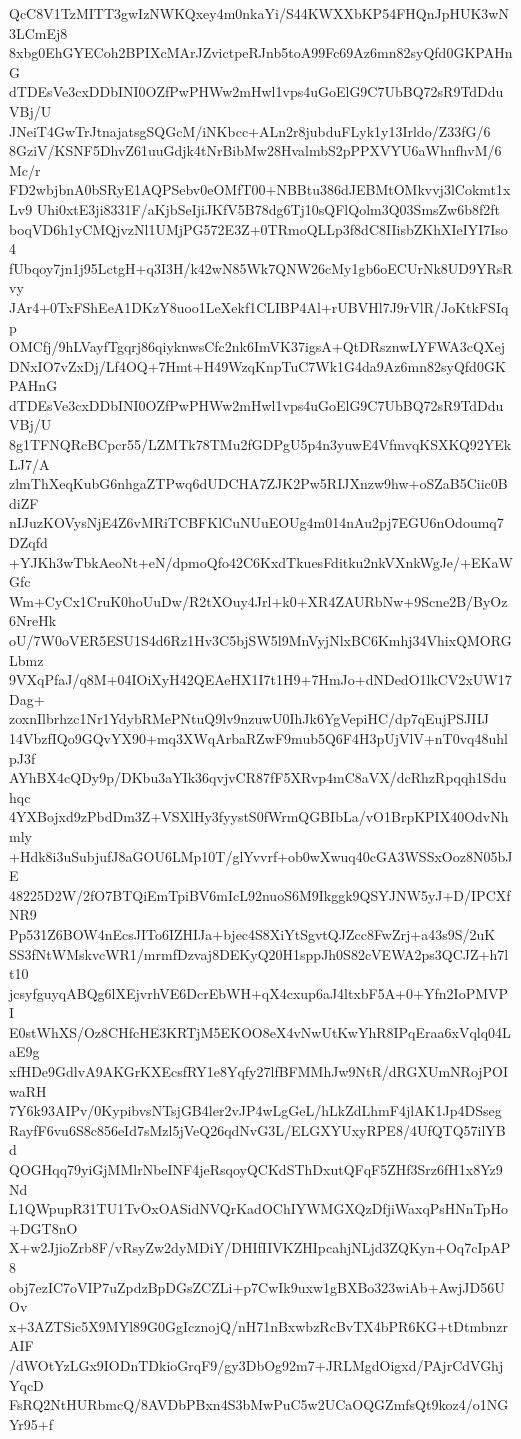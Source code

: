 QcC8V1TzMITT3gwIzNWKQxey4m0nkaYi/S44KWXXbKP54FHQnJpHUK3wN3LCmEj8
8xbg0EhGYECoh2BPIXcMArJZvictpeRJnb5toA99Fc69Az6mn82syQfd0GKPAHnG
dTDEsVe3cxDDbINI0OZfPwPHWw2mHwl1vps4uGoElG9C7UbBQ72sR9TdDduVBj/U
JNeiT4GwTrJtnajatsgSQGcM/iNKbcc+ALn2r8jubduFLyk1y13Irldo/Z33fG/6
8GziV/KSNF5DhvZ61uuGdjk4tNrBibMw28HvalmbS2pPPXVYU6aWhnfhvM/6Mc/r
FD2wbjbnA0bSRyE1AQPSebv0eOMfT00+NBBtu386dJEBMtOMkvvj3lCokmt1xLv9
Uhi0xtE3ji8331F/aKjbSeIjiJKfV5B78dg6Tj10sQFlQolm3Q03SmsZw6b8f2ft
boqVD6h1yCMQjvzNl1UMjPG572E3Z+0TRmoQLLp3f8dC8IIisbZKhXIeIYI7Iso4
fUbqoy7jn1j95LctgH+q3I3H/k42wN85Wk7QNW26cMy1gb6oECUrNk8UD9YRsRvy
JAr4+0TxFShEeA1DKzY8uoo1LeXekf1CLIBP4Al+rUBVHl7J9rVlR/JoKtkFSIqp
OMCfj/9hLVayfTgqrj86qiyknwsCfc2nk6ImVK37igsA+QtDRsznwLYFWA3cQXej
DNxIO7vZxDj/Lf4OQ+7Hmt+H49WzqKnpTuC7Wk1G4da9Az6mn82syQfd0GKPAHnG
dTDEsVe3cxDDbINI0OZfPwPHWw2mHwl1vps4uGoElG9C7UbBQ72sR9TdDduVBj/U
8g1TFNQRcBCpcr55/LZMTk78TMu2fGDPgU5p4n3yuwE4VfmvqKSXKQ92YEkLJ7/A
zlmThXeqKubG6nhgaZTPwq6dUDCHA7ZJK2Pw5RIJXnzw9hw+oSZaB5Ciic0BdiZF
nIJuzKOVysNjE4Z6vMRiTCBFKlCuNUuEOUg4m014nAu2pj7EGU6nOdoumq7DZqfd
+YJKh3wTbkAeoNt+eN/dpmoQfo42C6KxdTkuesFditku2nkVXnkWgJe/+EKaWGfc
Wm+CyCx1CruK0hoUuDw/R2tXOuy4Jrl+k0+XR4ZAURbNw+9Scne2B/ByOz6NreHk
oU/7W0oVER5ESU1S4d6Rz1Hv3C5bjSW5l9MnVyjNlxBC6Kmhj34VhixQMORGLbmz
9VXqPfaJ/q8M+04IOiXyH42QEAeHX1I7t1H9+7HmJo+dNDedO1lkCV2xUW17Dag+
zoxnIlbrhzc1Nr1YdybRMePNtuQ9lv9nzuwU0IhJk6YgVepiHC/dp7qEujPSJIIJ
14VbzfIQo9GQvYX90+mq3XWqArbaRZwF9mub5Q6F4H3pUjVlV+nT0vq48uhlpJ3f
AYhBX4cQDy9p/DKbu3aYIk36qvjvCR87fF5XRvp4mC8aVX/dcRhzRpqqh1Sduhqc
4YXBojxd9zPbdDm3Z+VSXlHy3fyystS0fWrmQGBIbLa/vO1BrpKPIX40OdvNhmly
+Hdk8i3uSubjufJ8aGOU6LMp10T/glYvvrf+ob0wXwuq40cGA3WSSxOoz8N05bJE
48225D2W/2fO7BTQiEmTpiBV6mIcL92nuoS6M9Ikggk9QSYJNW5yJ+D/IPCXfNR9
Pp531Z6BOW4nEcsJITo6IZHIJa+bjec4S8XiYtSgvtQJZcc8FwZrj+a43s9S/2uK
SS3fNtWMskvcWR1/mrmfDzvaj8DEKyQ20H1sppJh0S82cVEWA2ps3QCJZ+h7lt10
jcsyfguyqABQg6lXEjvrhVE6DcrEbWH+qX4cxup6aJ4ltxbF5A+0+Yfn2IoPMVPI
E0stWhXS/Oz8CHfcHE3KRTjM5EKOO8eX4vNwUtKwYhR8IPqEraa6xVqlq04LaE9g
xfHDe9GdlvA9AKGrKXEcsfRY1e8Yqfy27lfBFMMhJw9NtR/dRGXUmNRojPOIwaRH
7Y6k93AIPv/0KypibvsNTsjGB4ler2vJP4wLgGeL/hLkZdLhmF4jlAK1Jp4DSseg
RayfF6vu6S8c856eId7sMzl5jVeQ26qdNvG3L/ELGXYUxyRPE8/4UfQTQ57ilYBd
QOGHqq79yiGjMMlrNbeINF4jeRsqoyQCKdSThDxutQFqF5ZHf3Srz6fH1x8Yz9Nd
L1QWpupR31TU1TvOxOASidNVQrKadOChIYWMGXQzDfjiWaxqPsHNnTpHo+DGT8nO
X+w2JjioZrb8F/vRsyZw2dyMDiY/DHIfIIVKZHIpcahjNLjd3ZQKyn+Oq7cIpAP8
obj7ezIC7oVIP7uZpdzBpDGsZCZLi+p7CwIk9uxw1gBXBo323wiAb+AwjJD56UOv
x+3AZTSic5X9MYl89G0GgIcznojQ/nH71nBxwbzRcBvTX4bPR6KG+tDtmbnzrAIF
/dWOtYzLGx9IODnTDkioGrqF9/gy3DbOg92m7+JRLMgdOigxd/PAjrCdVGhjYqcD
FsRQ2NtHURbmcQ/8AVDbPBxn4S3bMwPuC5w2UCaOQGZmfsQt9koz4/o1NGYr95+f
